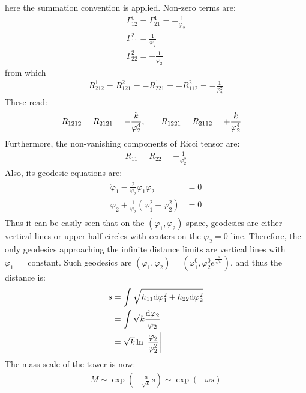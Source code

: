 here the summation convention is applied. Non-zero terms are:
\begin{align}
    \label{eq:2.53}
    \Gamma _{12} ^{1} = \Gamma _{21}^{1} = -\frac{1}{\varphi _{2}} \\
    \label{eq:2.54}
    \Gamma _{11} ^{2} = \frac{1}{\varphi _{2}}\\
    \label{eq:2.55}
    \Gamma _{22}^{2} = -\frac{1}{\varphi _{2}}
\end{align}
from which
\begin{align}
    R_{212}^{1} = R_{121}^{2} = -R_{221}^{1} = -R_{112}^{2} = -\frac{1}{\varphi_{2} ^{2}}
\end{align}
These read:
\begin{align}
    R_{1212} = R_{2121} = -\frac{k}{\varphi_{2} ^{4}} ,& \qq{} R_{1221} = R_{2112} = +\frac{k}{\varphi_{2} ^{4}}
\end{align}
Furthermore, the non-vanishing components of Ricci tensor are:
\begin{align}
    R_{11} = R_{22} = -\frac{1}{\varphi_{2}^{2}}
\end{align}
Also, its geodesic equations are:
\begin{align}[left=\empheqlbrace]
    \begin{split}
        \ddot \varphi_{1} - \frac{2}{\varphi_{2}} \dot \varphi_{1} \dot \varphi_{2} &= 0 \\
        \ddot \varphi_{2} +\frac{1}{\varphi_{2}} (\varphi_{1} ^{2} - \varphi_{2}^{2}) &=0
    \end{split}
\end{align}
Thus it can be easily seen that on the $(\varphi_{1},\varphi_{2})$ space, geodesics are either vertical lines or upper-half circles with centers on the $\varphi_{2} = 0$ line. Therefore, the only geodesics approaching the infinite distance limits are vertical lines with $\varphi_{1} = $ constant. Such geodesics are $(\varphi_{1}, \varphi_{2}) =  (\varphi_{1}^{0}, \varphi_{2}^{0} e^{\frac{s}{\sqrt{k}}})$, and thus the distance is:
\begin{align}
    \begin{split}
    s &= \int \sqrt{h_{11} \dd \varphi_{1} ^{2} + h_{22} \dd \varphi_{2} ^{2}} \\
    &= \int \sqrt{k}\frac{\dd \varphi_{2}}{\varphi_{2}} \\
    &= \sqrt{k} \ln \abs{\frac{\varphi_{2}}{\varphi_{2}^{2}}}
    \end{split}
\end{align}
The mass scale of the tower is now:
\begin{align}
    M \sim \exp (-\frac{a}{\sqrt{k}}s) \sim \exp (-\omega s)
\end{align}
